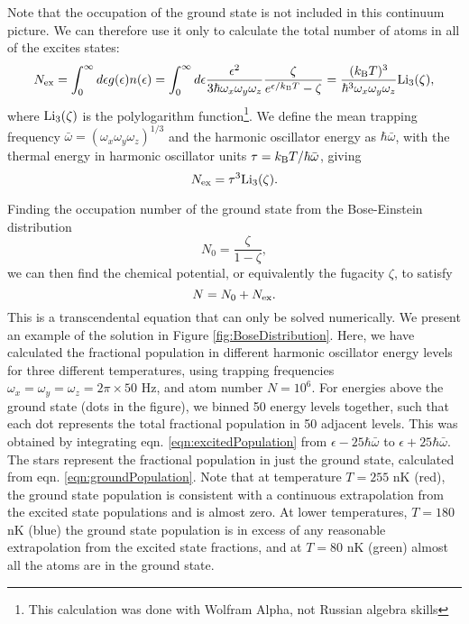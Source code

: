 Note that the occupation of the ground state is not included in this continuum picture. We can therefore use it only to calculate the total number of atoms in all of the excites states:
\begin{equation}
N_{\rm ex} = \int_0^{\infty} d\epsilon g(\epsilon) n(\epsilon) = \int_0^{\infty} d\epsilon \frac{\epsilon^2}{3\hbar\omega_x \omega_y \omega_z} \frac{\zeta}{e^{\epsilon/k_{\rm B}T}-\zeta} = \frac{(k_{\rm B}T)^3}{\hbar^3\omega_x \omega_y \omega_z}{\rm Li}_3(\zeta),
\label{eqn:excitedPopulation}
\end{equation}
where ${\rm Li}_3(\zeta)$ is the polylogarithm function\footnote{This calculation was done with Wolfram Alpha, not Russian algebra skills}. 
We define the mean trapping frequency $\bar{\omega} = (\omega_x \omega_y \omega_z)^{1/3}$ and the harmonic oscillator energy as $\hbar\bar{\omega}$, with the thermal energy in harmonic oscillator units $\tau = k_{\rm B}T/\hbar\bar{\omega}$, giving
\begin{equation}
N_{\rm ex} = \tau^3 {\rm Li}_3(\zeta).
\end{equation}

Finding the occupation number of the ground state from the Bose-Einstein distribution
\begin{equation}
N_0 = \frac{\zeta}{1-\zeta},
\label{eqn:groundPopulation}
\end{equation}
we can then find the chemical potential, or equivalently the fugacity $\zeta$, to satisfy
\begin{equation}
N = N_0 + N_{\rm ex}.
\end{equation}
This is a transcendental equation that can only be solved numerically. We present an example of the solution in Figure \ref{fig:BoseDistribution}. Here, we have calculated the fractional population in different harmonic oscillator energy levels for three different temperatures, using trapping frequencies $\omega_x=\omega_y=\omega_z=2\pi\times 50$ Hz, and atom number $N=10^6$. For energies above the ground state (dots in the figure), we binned 50 energy levels together, such that each dot represents the total fractional population in 50 adjacent levels. This was obtained by integrating eqn. \ref{eqn:excitedPopulation} from $\epsilon - 25\hbar\bar{\omega}$ to $\epsilon + 25\hbar\bar{\omega}$. The stars represent the fractional population in just the ground state, calculated from eqn. \ref{eqn:groundPopulation}. Note that at temperature $T=255$ nK (red), the ground state population is consistent with a continuous extrapolation from the excited state populations and is almost zero. At lower temperatures, $T=180$ nK (blue) the ground state population is in excess of any reasonable extrapolation from the excited state fractions, and at $T=80$ nK (green) almost all the atoms are in the ground state. 

